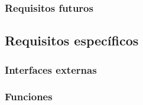 \documentclass{article}
\begin{document}
        \subsubsection{Requisitos futuros}





    \subsection{Requisitos específicos}





        \subsubsection{Interfaces externas}





        \subsubsection{Funciones}




\end{document}
